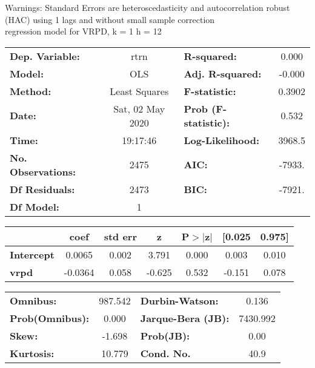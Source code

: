 Warnings: \newline
 [1] Standard Errors are heteroscedasticity and autocorrelation robust (HAC) using 1 lags and without small sample correction\\ 

regression model for VRPD, k = 1 h = 12\begin{center}
\begin{tabular}{lclc}
\toprule
\textbf{Dep. Variable:}    &       rtrn       & \textbf{  R-squared:         } &     0.000   \\
\textbf{Model:}            &       OLS        & \textbf{  Adj. R-squared:    } &    -0.000   \\
\textbf{Method:}           &  Least Squares   & \textbf{  F-statistic:       } &    0.3902   \\
\textbf{Date:}             & Sat, 02 May 2020 & \textbf{  Prob (F-statistic):} &    0.532    \\
\textbf{Time:}             &     19:17:46     & \textbf{  Log-Likelihood:    } &    3968.5   \\
\textbf{No. Observations:} &        2475      & \textbf{  AIC:               } &    -7933.   \\
\textbf{Df Residuals:}     &        2473      & \textbf{  BIC:               } &    -7921.   \\
\textbf{Df Model:}         &           1      & \textbf{                     } &             \\
\bottomrule
\end{tabular}
\begin{tabular}{lcccccc}
                   & \textbf{coef} & \textbf{std err} & \textbf{z} & \textbf{P$> |$z$|$} & \textbf{[0.025} & \textbf{0.975]}  \\
\midrule
\textbf{Intercept} &       0.0065  &        0.002     &     3.791  &         0.000        &        0.003    &        0.010     \\
\textbf{vrpd}      &      -0.0364  &        0.058     &    -0.625  &         0.532        &       -0.151    &        0.078     \\
\bottomrule
\end{tabular}
\begin{tabular}{lclc}
\textbf{Omnibus:}       & 987.542 & \textbf{  Durbin-Watson:     } &    0.136  \\
\textbf{Prob(Omnibus):} &   0.000 & \textbf{  Jarque-Bera (JB):  } & 7430.992  \\
\textbf{Skew:}          &  -1.698 & \textbf{  Prob(JB):          } &     0.00  \\
\textbf{Kurtosis:}      &  10.779 & \textbf{  Cond. No.          } &     40.9  \\
\bottomrule
\end{tabular}
\end{center}

